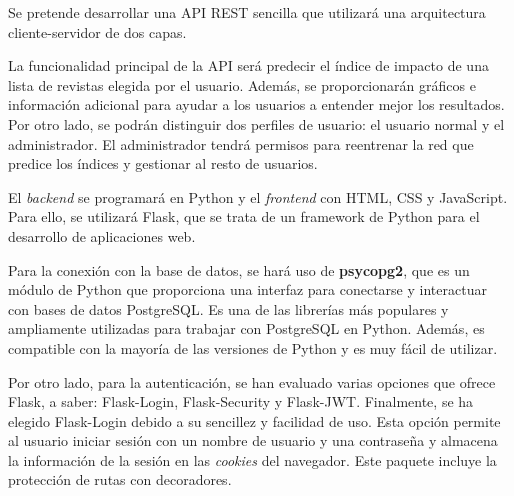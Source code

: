 
Se pretende desarrollar una API REST sencilla que utilizará una arquitectura cliente-servidor de dos capas.

La funcionalidad principal de la API será predecir el índice de impacto de una lista de revistas elegida por el usuario. Además, se proporcionarán gráficos e información adicional para ayudar a los usuarios a entender mejor los resultados. Por otro lado, se podrán distinguir dos perfiles de usuario: el usuario normal y el administrador. El administrador tendrá permisos para reentrenar la red que predice los índices y gestionar al resto de usuarios.

El \textit{backend} se programará en Python y el \textit{frontend} con HTML, CSS y JavaScript. Para ello, se utilizará Flask, que se trata de un framework de Python para el desarrollo de aplicaciones web.

Para la conexión con la base de datos, se hará uso de \textbf{psycopg2}, que es un módulo de Python que proporciona una interfaz para conectarse y interactuar con bases de datos PostgreSQL. 
Es una de las librerías más populares y ampliamente utilizadas para trabajar con PostgreSQL en Python. Además, es compatible con la mayoría de las versiones de Python y es muy fácil de utilizar.

Por otro lado, para la autenticación, se han evaluado varias opciones que ofrece Flask, a saber: Flask-Login, Flask-Security y Flask-JWT. Finalmente, se ha elegido Flask-Login debido a su sencillez y facilidad de uso. Esta opción permite al usuario iniciar sesión con un nombre de usuario y una contraseña y almacena la información de la sesión en las \textit{cookies} del navegador. Este paquete incluye la protección de rutas con decoradores.

